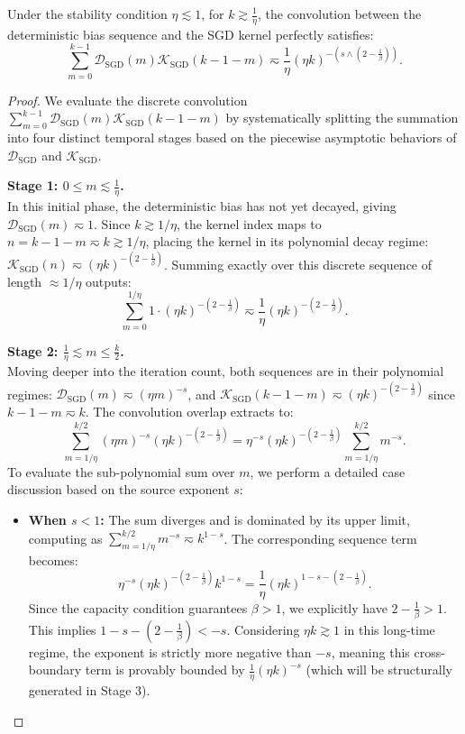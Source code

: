 \begin{lemma}
\label{lem:sgd_conv}
Under the stability condition $\eta \lesssim 1$, for $k \gtrsim \frac{1}{\eta}$, the convolution between the deterministic bias sequence and the SGD kernel perfectly satisfies:
\begin{equation*}
    \sum_{m=0}^{k-1} \mathcal{D}_{\mathrm{SGD}}(m) \mathcal{K}_{\mathrm{SGD}}(k-1-m) \eqsim \frac{1}{\eta} (\eta k)^{-\left(s \wedge \left(2-\frac{1}{\beta}\right)\right)}.
\end{equation*}
\end{lemma}
\begin{proof}
We evaluate the discrete convolution $\sum_{m=0}^{k-1} \mathcal{D}_{\mathrm{SGD}}(m) \mathcal{K}_{\mathrm{SGD}}(k-1-m)$ by systematically splitting the summation into four distinct temporal stages based on the piecewise asymptotic behaviors of $\mathcal{D}_{\mathrm{SGD}}$ and $\mathcal{K}_{\mathrm{SGD}}$.

\textbf{Stage 1: $0 \le m \lesssim \frac{1}{\eta}$.} \\
In this initial phase, the deterministic bias has not yet decayed, giving $\mathcal{D}_{\mathrm{SGD}}(m) \eqsim 1$. Since $k \gtrsim 1/\eta$, the kernel index maps to $n = k-1-m \eqsim k \gtrsim 1/\eta$, placing the kernel in its polynomial decay regime: $\mathcal{K}_{\mathrm{SGD}}(n) \eqsim (\eta k)^{-\left(2-\frac{1}{\beta}\right)}$. Summing exactly over this discrete sequence of length $\approx 1/\eta$ outputs:
\[
    \sum_{m=0}^{1/\eta} 1 \cdot (\eta k)^{-\left(2-\frac{1}{\beta}\right)} \eqsim \frac{1}{\eta} (\eta k)^{-\left(2-\frac{1}{\beta}\right)}.
\]

\textbf{Stage 2: $\frac{1}{\eta} \lesssim m \le \frac{k}{2}$.} \\
Moving deeper into the iteration count, both sequences are in their polynomial regimes: $\mathcal{D}_{\mathrm{SGD}}(m) \eqsim (\eta m)^{-s}$, and $\mathcal{K}_{\mathrm{SGD}}(k-1-m) \eqsim (\eta k)^{-\left(2-\frac{1}{\beta}\right)}$ since $k-1-m \eqsim k$. The convolution overlap extracts to:
\[
    \sum_{m=1/\eta}^{k/2} (\eta m)^{-s} (\eta k)^{-\left(2-\frac{1}{\beta}\right)} = \eta^{-s} (\eta k)^{-\left(2-\frac{1}{\beta}\right)} \sum_{m=1/\eta}^{k/2} m^{-s}.
\]
To evaluate the sub-polynomial sum over $m$, we perform a detailed case discussion based on the source exponent $s$:
\begin{itemize}
    \item \textbf{When $s < 1$:} The sum diverges and is dominated by its upper limit, computing as $\sum_{m=1/\eta}^{k/2} m^{-s} \eqsim k^{1-s}$. The corresponding sequence term becomes:
    \[
        \eta^{-s} (\eta k)^{-\left(2-\frac{1}{\beta}\right)} k^{1-s} = \frac{1}{\eta} (\eta k)^{1-s-\left(2-\frac{1}{\beta}\right)}.
    \]
    Since the capacity condition guarantees $\beta > 1$, we explicitly have $2-\frac{1}{\beta} > 1$. This implies $1-s-\left(2-\frac{1}{\beta}\right) < -s$. Considering $\eta k \gtrsim 1$ in this long-time regime, the exponent is strictly more negative than $-s$, meaning this cross-boundary term is provably bounded by $\frac{1}{\eta}(\eta k)^{-s}$ (which will be structurally generated in Stage 3).
    

\end{itemize}
\end{proof}
